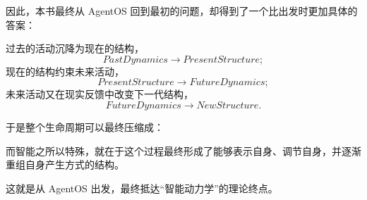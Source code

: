 因此，本书最终从 AgentOS 回到最初的问题，却得到了一个比出发时更加具体的答案：

\begin{statementbox}
\centering
{}
\end{statementbox}

过去的活动沉降为现在的结构，
\begin{equation}
PastDynamics
\rightarrow
PresentStructure;
\end{equation}
现在的结构约束未来活动，
\begin{equation}
PresentStructure
\rightarrow
FutureDynamics;
\end{equation}
未来活动又在现实反馈中改变下一代结构，
\begin{equation}
FutureDynamics
\rightarrow
NewStructure.
\end{equation}

于是整个生命周期可以最终压缩成：
\begin{statementbox}
\centering
{}
\end{statementbox}

而智能之所以特殊，就在于这个过程最终形成了能够表示自身、调节自身，并逐渐重组自身产生方式的结构。

这就是从 AgentOS 出发，最终抵达“智能动力学”的理论终点。
